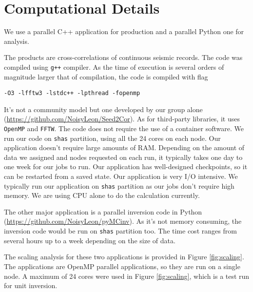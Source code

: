 \documentclass[10pt, letterpaper]{article}
\begin{document}
\section{Computational Details}\label{sec:method}

We use a parallel C++ application for production
and a parallel Python one for analysis.

The products are cross-correlations of continuous seismic records.
The code was compiled using \lstinline{g++} compiler.
As the time of execution is several orders of magnitude
larger that of compilation, the code is compiled with flag

\begin{lstlisting}
-O3 -lfftw3 -lstdc++ -lpthread -fopenmp
\end{lstlisting}

It's not a community model but one developed by our group alone (\url{https://github.com/NoisyLeon/Seed2Cor}).
As for third-party libraries, it uses \lstinline{OpenMP} and \lstinline{FFTW}.
The code does not require the use of a container software.
We run our code on \lstinline{shas} partition, using all the 24 cores on each node. Our application doesn't require large amounts of RAM. Depending on the amount of data we assigned and nodes requested on each run, it typically takes one day to one week for our jobs to run. Our application has well-designed checkpoints, so it can be restarted from a saved state. Our application is very I/O intensive. We typically run our application on \lstinline{shas} partition as our jobs don't require high memory.
We are using CPU alone to do the calculation currently.

The other major application is a parallel inversion code in Python
(\url{https://github.com/NoisyLeon/pyMCinv}).
As it's not memory consuming, the inversion code would be run on \lstinline{shas} partition too. The time cost ranges from several hours up to a week depending on the size of data.

The scaling analysis for these two applications is provided in Figure \ref{fig:scaling}.
The applications are OpenMP parallel applications, so they are run on a single node.
A maximum of 24 cores were used in Figure \ref{fig:scaling},
which is a test run for unit inversion.
\end{document}
